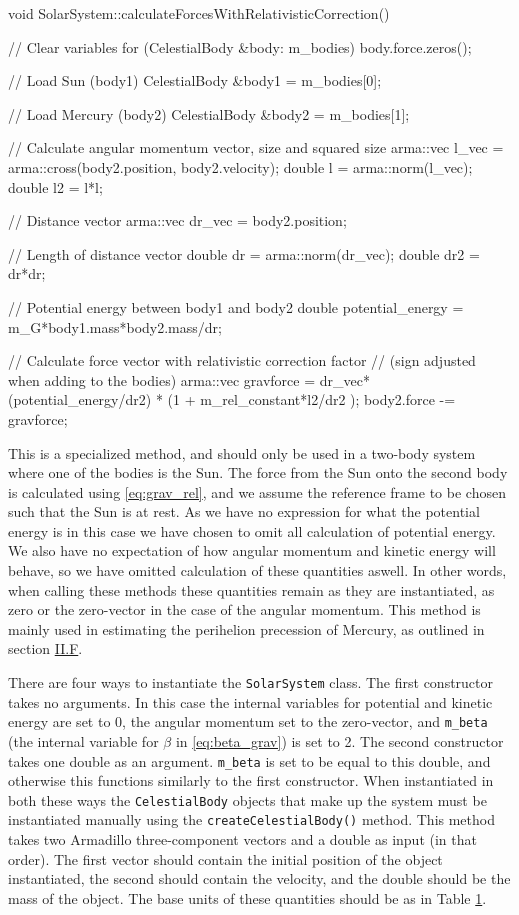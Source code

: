 \documentclass[reprint,english,notitlepage]{revtex4-1}  %
\begin{document}
\begin{cpp}
void SolarSystem::calculateForcesWithRelativisticCorrection() {
  // Clear variables
  for (CelestialBody &body: m_bodies) {
    body.force.zeros();
  }

  // Load Sun (body1)
  CelestialBody &body1 = m_bodies[0];

  // Load Mercury (body2)
  CelestialBody &body2 = m_bodies[1];

  // Calculate angular momentum vector, size and squared size
  arma::vec l_vec = arma::cross(body2.position, body2.velocity);
  double l = arma::norm(l_vec);
  double l2 = l*l;


  // Distance vector
  arma::vec dr_vec = body2.position;

  // Length of distance vector
  double dr = arma::norm(dr_vec);
  double dr2 = dr*dr;

  // Potential energy between body1 and body2
  double potential_energy = m_G*body1.mass*body2.mass/dr;

  // Calculate force vector with relativistic correction factor
  // (sign adjusted when adding to the bodies)
  arma::vec gravforce = dr_vec*(potential_energy/dr2)
  					    * (1 + m_rel_constant*l2/dr2 );
  body2.force -= gravforce;
}
\end{cpp}

This is a specialized method, and should only be used in a two-body system where one of the bodies is the Sun. The force from the Sun onto the second body is calculated using \eqref{eq:grav_rel}, and we assume the reference frame to be chosen such that the Sun is at rest. As we have no expression for what the potential energy is in this case we have chosen to omit all calculation of potential energy. We also have no expectation of how angular momentum and kinetic energy will behave, so we have omitted calculation of these quantities aswell. In other words, when calling these methods these quantities remain as they are instantiated, as zero or the zero-vector in the case of the angular momentum. This method is mainly used in estimating the perihelion precession of Mercury, as outlined in section \hyperref[sec:II:f]{II.F}.

There are four ways to instantiate the \verb+SolarSystem+ class. The first constructor takes no arguments. In this case the internal variables for potential and kinetic energy are set to 0, the angular momentum set to the zero-vector, and \verb+m_beta+ (the internal variable for $\beta$ in \eqref{eq:beta_grav}) is set to 2. The second constructor takes one double as an argument. \verb+m_beta+ is set to be equal to this double, and otherwise this functions similarly to the first constructor. When instantiated in both these ways the \verb+CelestialBody+ objects that make up the system must be instantiated manually using the \verb+createCelestialBody()+ method. This method takes two Armadillo \citep{Armadillo} three-component vectors and a double as input (in that order). The first vector should contain the initial position of the object instantiated, the second should contain the velocity, and the double should be the mass of the object. The base units of these quantities should be as in Table \hyperref[table:III:a:i]{1}. \newline
\end{document}
